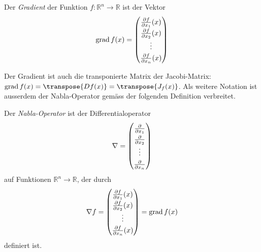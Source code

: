 \begin{definition}
\label{buch:richtungsableitung:def:gradient}
Der {\em Gradient} der Funktion $f\colon\mathbb{R}^n\to\mathbb{R}$ ist der
Vektor
\[
\operatorname{grad}f(x)
=
{
\renewcommand{\arraystretch}{1.3}
\begin{pmatrix}
\frac{\partial f}{\partial x_1}(x)\\
\frac{\partial f}{\partial x_2}(x)\\
\vdots \\
\frac{\partial f}{\partial x_n}(x)
\end{pmatrix}
}
\]
\end{definition}

Der Gradient ist auch die transponierte Matrix der Jacobi-Matrix:
$\operatorname{grad}f(x) = \transpose{Df(x)} = \transpose{J_f(x)}$.
Als weitere Notation ist ausserdem der Nabla-Operator gemäss der folgenden
Definition verbreitet.

\begin{definition}
\label{buch:fuvar:richtungsableitung:def:nabla}
Der {\em Nabla-Operator} ist der Differentialoperator
%
%
\[
\nabla 
=
{
\renewcommand{\arraystretch}{1.3}
\begin{pmatrix}
\frac{\partial}{\partial x_1}\\
\frac{\partial}{\partial x_2}\\
\vdots\\
\frac{\partial}{\partial x_n}
\end{pmatrix}
}
\]
auf Funktionen
$\mathbb{R}^n\to\mathbb{R}$, der durch
\[
\nabla f
=
{
\renewcommand{\arraystretch}{1.3}
\begin{pmatrix}
\frac{\partial f}{\partial x_1}(x)\\
\frac{\partial f}{\partial x_2}(x)\\
\vdots\\
\frac{\partial f}{\partial x_n}(x)
\end{pmatrix}
}
=
\operatorname{grad}f(x)
\]
definiert ist.
\end{definition}



